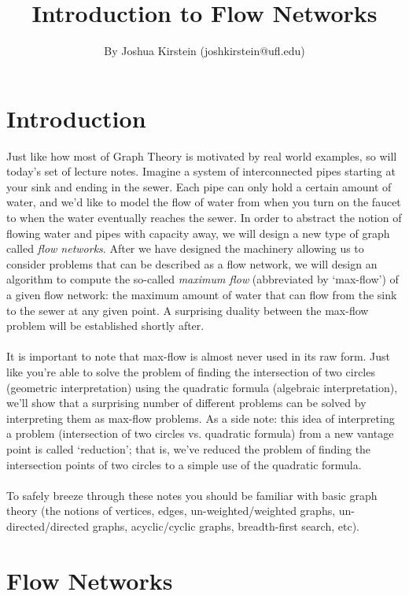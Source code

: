 \documentclass[11pt]{article}
\theoremstyle{plain}
\theoremstyle{definition}
\begin{document}
 


\title{Introduction to Flow Networks}
\author{By Joshua Kirstein (joshkirstein@ufl.edu)}
\maketitle

\section{Introduction}
Just like how most of Graph Theory is motivated by real world examples, so will today's set of lecture notes. Imagine a system of interconnected pipes starting at your sink and ending in the sewer. Each pipe can only hold a certain amount of water, and we'd like to model the flow of water from when you turn on the faucet to when the water eventually reaches the sewer. In order to abstract the notion of flowing water and pipes with capacity away, we will design a new type of graph called \emph{flow networks}. After we have designed the machinery allowing us to consider problems that can be described as a flow network, we will design an algorithm to compute the so-called \emph{maximum flow} (abbreviated by `max-flow') of a given flow network: the maximum amount of water that can flow from the sink to the sewer at any given point. A surprising duality between the max-flow problem will be established shortly after.\\\\
It is important to note that max-flow is almost never used in its raw form. Just like you're able to solve the problem of finding the intersection of two circles (geometric interpretation) using the quadratic formula (algebraic interpretation), we'll show that a surprising number of different problems can be solved by interpreting them as max-flow problems. As a side note: this idea of interpreting a problem (intersection of two circles vs. quadratic formula) from a new vantage point is called `reduction'; that is, we've reduced the problem of finding the intersection points of two circles to a simple use of the quadratic formula.\\\\
To safely breeze through these notes you should be familiar with basic graph theory (the notions of vertices, edges, un-weighted/weighted graphs, un-directed/directed graphs, acyclic/cyclic graphs, breadth-first search, etc).
\section{Flow Networks}
\end{document}
